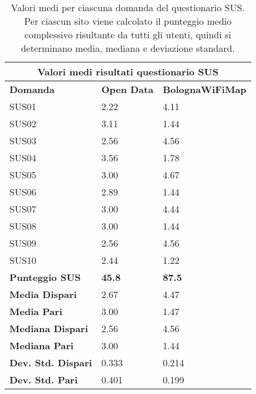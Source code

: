 \begin{center}
    \begin{table}[H]
        \centering
        \begin{tabularx}{\textwidth}{|X|X|X|}
            \hline
            \multicolumn{3}{|c|}{\textbf{Valori medi risultati questionario SUS}} \\
            \hline
            \textbf{Domanda} & \textbf{Open Data} & \textbf{BolognaWiFiMap} \\
            \hline
            SUS01 & 2.22 & 4.11 \\
            SUS02 & 3.11 & 1.44 \\
            SUS03 & 2.56 & 4.56 \\
            SUS04 & 3.56 & 1.78 \\
            SUS05 & 3.00 & 4.67 \\
            SUS06 & 2.89 & 1.44 \\
            SUS07 & 3.00 & 4.44 \\
            SUS08 & 3.00 & 1.44 \\
            SUS09 & 2.56 & 4.56 \\
            SUS10 & 2.44 & 1.22 \\
            \hline
            \textbf{Punteggio SUS} & \textbf{45.8} & \textbf{87.5} \\
            \hline
            \textbf{Media Dispari} & 2.67 & 4.47 \\
            \textbf{Media Pari} & 3.00 & 1.47 \\
            \hline
            \textbf{Mediana Dispari} & 2.56 & 4.56 \\
            \textbf{Mediana Pari} & 3.00 & 1.44 \\
            \hline
            \textbf{Dev. Std. Dispari} & 0.333 & 0.214 \\
            \textbf{Dev. Std. Pari} & 0.401 & 0.199 \\
            \hline
        \end{tabularx}
        \caption[Valori medi totali e per domanda del questionario SUS]{Valori medi per ciascuna domanda del questionario SUS. Per ciascun sito viene calcolato il punteggio medio complessivo risultante da tutti gli utenti, quindi si determinano media, mediana e deviazione standard.}
        \label{tab:sus_avg_values}
    \end{table}
\end{center}

